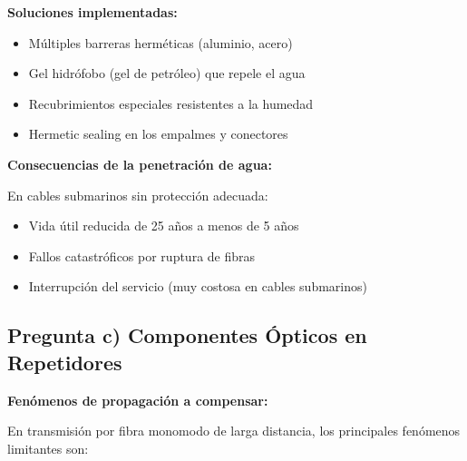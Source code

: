\documentclass[11pt,a4paper]{article}
\begin{document}
\textbf{Soluciones implementadas:}

\begin{itemize}
    \item Múltiples barreras herméticas (aluminio, acero)
    \item Gel hidrófobo (gel de petróleo) que repele el agua
    \item Recubrimientos especiales resistentes a la humedad
    \item Hermetic sealing en los empalmes y conectores
\end{itemize}

\textbf{Consecuencias de la penetración de agua:}

En cables submarinos sin protección adecuada:
\begin{itemize}
    \item Vida útil reducida de 25 años a menos de 5 años
    \item Fallos catastróficos por ruptura de fibras
    \item Interrupción del servicio (muy costosa en cables submarinos)
\end{itemize}

\subsection{Pregunta c) Componentes Ópticos en Repetidores}

\textbf{Fenómenos de propagación a compensar:}

En transmisión por fibra monomodo de larga distancia, los principales fenómenos limitantes son:
\end{document}

